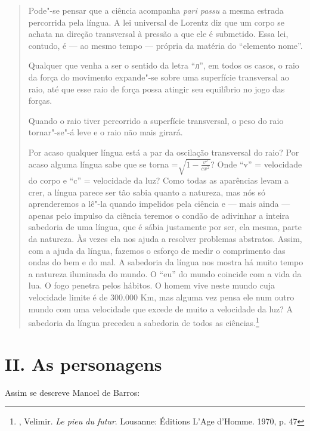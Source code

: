 \begin{quote}
Pode"-se pensar que a ciência acompanha \emph{pari passu} a mesma estrada
percorrida pela língua. A lei universal de Lorentz diz que um corpo se
achata na direção transversal à pressão a que ele é submetido. Essa lei,
contudo, é --- ao mesmo tempo --- própria da matéria do ``elemento nome''.

Qualquer que venha a ser o sentido da letra ``л'', em todos os casos, o
raio da força do movimento expande"-se sobre uma superfície transversal
ao raio, até que esse raio de força possa atingir seu equilíbrio no jogo
das forças.

Quando o raio tiver percorrido a superfície transversal, o peso do raio
tornar"-se"-á leve e o raio não mais girará.

Por acaso qualquer língua está a par da oscilação transversal do raio?
Por acaso alguma língua sabe que  se torna =$\sqrt{1-\frac{v^{2}}{cx^{2}}}$?
Onde ``v'' = velocidade do corpo e ``c'' = velocidade da luz? Como todas as
aparências levam a crer, a língua parece ser tão sabia quanto a
natureza, mas nós só aprenderemos a lê"-la quando impelidos pela ciência
e --- mais ainda --- apenas pelo impulso da ciência teremos o condão de
adivinhar a inteira sabedoria de uma língua, que é sábia justamente por
ser, ela mesma, parte da natureza. Às vezes ela nos ajuda a resolver
problemas abstratos. Assim, com a ajuda da língua, fazemos o esforço de
medir o comprimento das ondas do bem e do mal. A sabedoria da língua nos
mostra há muito tempo a natureza iluminada do mundo. O ``eu'' do mundo
coincide com a vida da lua. O fogo penetra pelos hábitos. O homem vive
neste mundo cuja velocidade limite é de 300.000 Km, mas alguma vez pensa
ele num outro mundo com uma velocidade que excede de muito a velocidade
da luz? A sabedoria da língua precedeu a sabedoria de todos as
ciências.\footnote{, Velimir. \emph{Le pieu du futur}.
  Lousanne: Éditions L'Age d'Homme. 1970, p. 47}
\end{quote}

\section{II. As personagens}

Assim se descreve Manoel de Barros:

